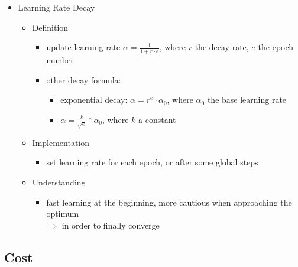 \begin{itemize}
\item Learning Rate Decay
	\begin{itemize}
	\item Definition
		\begin{itemize}
		\item update learning rate $\alpha = \frac 1 {1+r\cdot e}$, where $r$ the decay rate, $e$ the epoch number
		\item other decay formula:
			\begin{itemize}
			\item exponential decay: $\alpha=r^e\cdot\alpha_0$, where $\alpha_0$ the base learning rate
			\item $\alpha=\frac k {\sqrt{e}} * \alpha_0$, where $k$ a constant
			\end{itemize}
		\end{itemize}
	\item Implementation
		\begin{itemize}
		\item set learning rate for each epoch, or after some global steps
		\end{itemize}
	\item Understanding
		\begin{itemize}
		\item fast learning at the beginning, more cautious when approaching the optimum \\ 
		$\Rightarrow$ in order to finally converge
		\end{itemize}
	\end{itemize}
\end{itemize}

\subsection{Cost}
